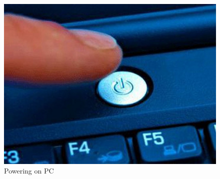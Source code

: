 \setlength{\columnsep}{3pt}
\begin{flushleft}
\bigskip
\bigskip
\begin{figure}[h!]
	\centering
	\includegraphics[scale=0.4]{content/chapter17/images/power_on.jpeg}
	\caption{Powering on PC}
	\label{fig:power}
\end{figure}



\end{flushleft}
